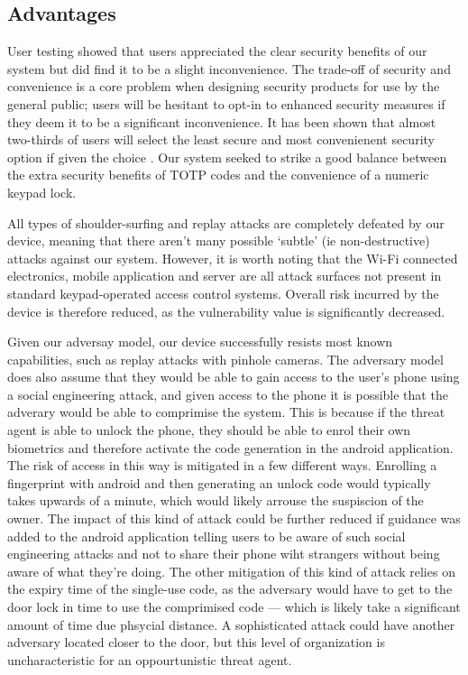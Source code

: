 \documentclass[conference]{IEEEtran}
\begin{document}
\subsection{Advantages}
User testing showed that users appreciated the clear security benefits of our system but did find it to be a slight inconvenience.
The trade-off of security and convenience is a core problem when designing security products for use by the general public; users will be hesitant to opt-in to enhanced security measures if they deem it to be a significant inconvenience.
It has been shown that almost two-thirds of users will select the least secure and most convenienent security option if given the choice \cite{bben1}.
Our system seeked to strike a good balance between the extra security benefits of TOTP codes and the convenience of a numeric keypad lock.

All types of shoulder-surfing and replay attacks are completely defeated by our device, meaning that there aren't many possible `subtle' (ie non-destructive) attacks against our system.
However, it is worth noting that the Wi-Fi connected electronics, mobile application and server are all attack surfaces not present in standard keypad-operated access control systems.
Overall risk incurred by the device is therefore reduced, as the vulnerability value is significantly decreased.

Given our adversay model, our device successfully resists most known capabilities, such as replay attacks with pinhole cameras.
The adversary model does also assume that they would be able to gain access to the user's phone using a social engineering attack, and given access to the phone it is possible that the adverary would be able to comprimise the system.
This is because if the threat agent is able to unlock the phone, they should be able to enrol their own biometrics and therefore activate the code generation in the android application.
The risk of access in this way is mitigated in a few different ways.
Enrolling a fingerprint with android  and then generating an unlock code would typically takes upwards of a minute, which would likely arrouse the suspiscion of the owner.
The impact of this kind of attack could be further reduced if guidance was added to the android application telling users to be aware of such social engineering attacks and not to share their phone wiht strangers without being aware of what they're doing.
The other mitigation of this kind of attack relies on the expiry time of the single-use code, as the adversary would have to get to the door lock in time to use the comprimised code --- which is likely take a significant amount of time due phsycial distance.
A sophisticated attack could have another adversary located closer to the door, but this level of organization is uncharacteristic for an oppourtunistic threat agent.
\end{document}
